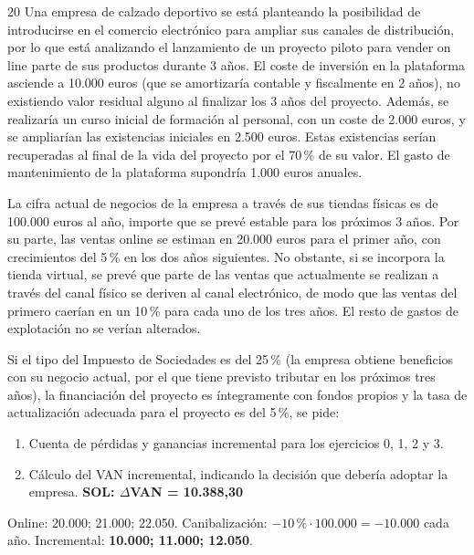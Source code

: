 \documentclass[10pt,a4paper,twoside]{article}
\newcommand{\eur}{\,\text{€}\xspace}
\newcommand{\paso}[1]{\par\smallskip{\sffamily\bfseries\color{steel}#1}\par\nopagebreak}
\begin{document}
\begin{enunciado}{20}
Una empresa de calzado deportivo se está planteando la posibilidad de introducirse en el comercio electrónico para
ampliar sus canales de distribución, por lo que está analizando el lanzamiento de un proyecto piloto para vender on line
parte de sus productos durante 3 años. El coste de inversión en la plataforma asciende a 10.000 euros (que se
amortizaría contable y fiscalmente en 2 años), no existiendo valor residual alguno al finalizar los 3 años del
proyecto. Además, se realizaría un curso inicial de formación al personal, con un coste de 2.000 euros, y se ampliarían
las existencias iniciales en 2.500 euros. Estas existencias serían recuperadas al final de la vida del proyecto por el
70\,\% de su valor. El gasto de mantenimiento de la plataforma supondría 1.000 euros anuales.

La cifra actual de negocios de la empresa a través de sus tiendas físicas es de 100.000 euros al año, importe que se
prevé estable para los próximos 3 años. Por su parte, las ventas online se estiman en 20.000 euros para el primer año,
con crecimientos del 5\,\% en los dos años siguientes. No obstante, si se incorpora la tienda virtual, se prevé que parte
de las ventas que actualmente se realizan a través del canal físico se deriven al canal electrónico, de modo que las
ventas del primero caerían en un 10\,\% para cada uno de los tres años. El resto de gastos de explotación no se verían
alterados.

Si el tipo del Impuesto de Sociedades es del 25\,\% (la empresa obtiene beneficios con su negocio actual, por el que tiene
previsto tributar en los próximos tres años), la financiación del proyecto es íntegramente con fondos propios y la tasa
de actualización adecuada para el proyecto es del 5\,\%, se pide:
\begin{enumerate}
  \item Cuenta de pérdidas y ganancias incremental para los ejercicios 0, 1, 2 y 3.
  \item Cálculo del VAN incremental, indicando la decisión que debería adoptar la empresa.
        \textbf{SOL: $\Delta$VAN = 10.388,30\eur}
\end{enumerate}
\end{enunciado}

\paso{Ventas incrementales}
Online: 20.000; 21.000; 22.050. Canibalización: $-10\,\%\cdot100.000=-10.000$ cada año.
Incremental: \textbf{10.000; 11.000; 12.050}.
\end{document}
